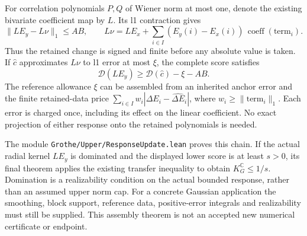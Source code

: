 For correlation polynomials $P,Q$ of Wiener norm at most one, denote the
existing bivariate coefficient map by $L$. Its l1 contraction gives
\[
 \|LE_y-L\nu\|_1\le AB,\qquad
 L\nu=L E_x+\sum_{i\in I}(E_y(i)-E_x(i))\,\operatorname{coeff}(\mathrm{term}_i).
\]
Thus the retained change is signed and finite before any absolute value
is taken. If $\widehat c$ approximates $L\nu$ to l1 error at most $\xi$,
the complete score satisfies
\[
 \boxed{\mathcal D(LE_y)\ge\mathcal D(\widehat c)-\xi-AB.}
\]
The reference allowance $\xi$ can be assembled from an inherited anchor
error and the finite retained-data price
$\sum_{i\in I}w_i|\Delta E_i-\widehat{\Delta E}_i|$, where
$w_i\ge\|\mathrm{term}_i\|_1$. Each error is charged once, including
its effect on the linear coefficient. No exact projection of either
response onto the retained polynomials is needed.

The module \texttt{Grothe/Upper/ResponseUpdate.lean} proves this chain.
If the actual radial kernel $LE_y$ is dominated and the displayed lower
score is at least $s>0$, its final theorem applies the existing transfer
inequality to obtain $K_G^{\mathbb C}\le1/s$. Domination is a
realizability condition on the actual bounded response, rather than an
assumed upper norm cap. For a concrete Gaussian application the smoothing,
block support, reference data, positive-error integrals and realizability
must still be supplied. This assembly theorem is not an accepted new
numerical certificate or endpoint.
